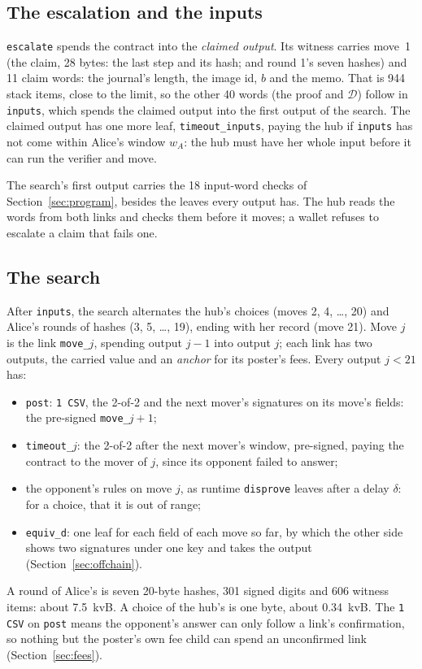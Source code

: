 \documentclass[11pt]{article}
\newcommand{\tx}[1]{\texttt{#1}}
\begin{document}
\subsection{The escalation and the inputs}
\label{sec:escalate}

\tx{escalate} spends the contract into the \emph{claimed output}. Its
witness carries move~1 (the claim, 28 bytes: the last step and its
hash; and round 1's seven hashes) and 11 claim words: the journal's
length, the image id, $b$ and the memo. That is 944 stack items, close
to the limit, so the other 40 words (the proof and $\mathcal{D}$) follow in
\tx{inputs}, which spends the claimed output into the first output of
the search. The claimed output has one more leaf, \tx{timeout\_inputs},
paying the hub if \tx{inputs} has not come within Alice's window $w_A$:
the hub must have her whole input before it can run the verifier and
move.

The search's first output carries the 18 input-word checks of
Section~\ref{sec:program}, besides the leaves every output has. The hub
reads the words from both links and checks them before it moves; a
wallet refuses to escalate a claim that fails one.

\subsection{The search}
\label{sec:ladder}

After \tx{inputs}, the search alternates the hub's choices (moves 2, 4,
\ldots, 20) and Alice's rounds of hashes (3, 5, \ldots, 19), ending with
her record (move 21). Move $j$ is the link \tx{move\_$j$}, spending
output $j-1$ into output $j$; each link has two outputs, the carried
value and an \emph{anchor} for its poster's fees. Every output $j < 21$
has:
\begin{itemize}[leftmargin=1.5em]
\item \tx{post}: \texttt{1 CSV}, the 2-of-2 and the next mover's
  signatures on its move's fields: the pre-signed \tx{move\_$j{+}1$};
\item \tx{timeout\_$j$}: the 2-of-2 after the next mover's window,
  pre-signed, paying the contract to the mover of $j$, since its
  opponent failed to answer;
\item the opponent's rules on move $j$, as runtime \tx{disprove} leaves
  after a delay $\delta$: for a choice, that it is out of range;
\item \tx{equiv\_d}: one leaf for each field of each move so far, by
  which the other side shows two signatures under one key and takes the
  output (Section~\ref{sec:offchain}).
\end{itemize}
A round of Alice's is seven 20-byte hashes, 301 signed digits and 606
witness items: about 7.5~kvB. A choice of the hub's is one byte, about
0.34~kvB. The \texttt{1 CSV} on \tx{post} means the opponent's answer
can only follow a link's confirmation, so nothing but the poster's own
fee child can spend an unconfirmed link (Section~\ref{sec:fees}).
\end{document}
